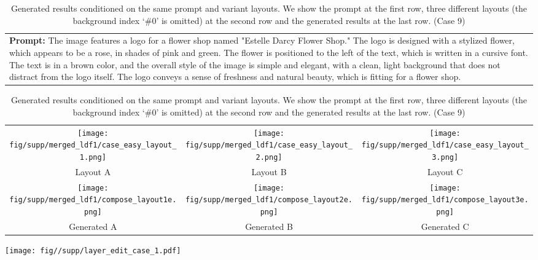 \begin{table}[htbp]
    \centering
    \begin{tabular}{p{\textwidth}}
    \midrule
    \textbf{Prompt:} \small{The image features a logo for a flower shop named "Estelle Darcy Flower Shop." The logo is designed with a stylized flower, which appears to be a rose, in shades of pink and green. The flower is positioned to the left of the text, which is written in a cursive font. The text is in a brown color, and the overall style of the image is simple and elegant, with a clean, light background that does not distract from the logo itself. The logo conveys a sense of freshness and natural beauty, which is fitting for a flower shop.}
    \vspace{1em}
    \end{tabular}
    \begin{tabular}{ccc}
        \texttt{[image: fig/supp/merged\_ldf1/case\_easy\_layout\_1.png]} &
        \texttt{[image: fig/supp/merged\_ldf1/case\_easy\_layout\_2.png]} &
        \texttt{[image: fig/supp/merged\_ldf1/case\_easy\_layout\_3.png]} \\
        \small{Layout A} & \small{Layout B} & \small{Layout C} \\[1em]
        \texttt{[image: fig/supp/merged\_ldf1/compose\_layout1e.png]} &
        \texttt{[image: fig/supp/merged\_ldf1/compose\_layout2e.png]} &
        \texttt{[image: fig/supp/merged\_ldf1/compose\_layout3e.png]} \\
        \small{Generated A} & \small{Generated B} & \small{Generated C} \\
        \bottomrule
    \end{tabular}
    
    \caption{Generated results conditioned on the same prompt and variant layouts. We show the prompt at the first row, three different layouts (the background index `\#0' is omitted) at the second row and the generated results at the last row. (Case 9)}
    \label{tab:variant_layout9}
\end{table}

\clearpage
\newpage



\begin{figure*}
    \centering
    \texttt{[image: fig//supp/layer\_edit\_case\_1.pdf]}
    \caption{Layer-wise editing of the generated image.}
    \label{fig:layer_edit_1}
\end{figure*}

